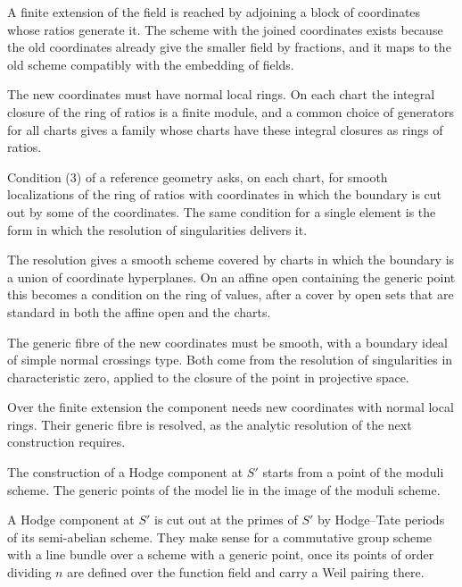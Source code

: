 A finite extension of the field is reached by adjoining a block of coordinates whose ratios generate it. The scheme
with the joined coordinates exists because the old coordinates already give the smaller field by fractions, and it maps
to the old scheme compatibly with the embedding of fields.

The new coordinates must have normal local rings. On each chart the integral closure of the ring of ratios is a finite
module, and a common choice of generators for all charts gives a family whose charts have these integral closures as
rings of ratios.

Condition (3) of a reference geometry asks, on each chart, for smooth localizations of the ring of ratios with
coordinates in which the boundary is cut out by some of the coordinates. The same condition for a single element is the
form in which the resolution of singularities delivers it.

The resolution gives a smooth scheme covered by charts in which the boundary is a union of coordinate hyperplanes. On an
affine open containing the generic point this becomes a condition on the ring of values, after a cover by open sets that
are standard in both the affine open and the charts.

The generic fibre of the new coordinates must be smooth, with a boundary ideal of simple normal crossings type. Both
come from the resolution of singularities in characteristic zero, applied to the closure of the point in projective
space.

Over the finite extension the component needs new coordinates with normal local rings. Their generic fibre is
resolved, as the analytic resolution of the next construction requires.

The construction of a Hodge component at $S'$ starts from a point of the moduli scheme. The generic points of the
model lie in the image of the moduli scheme.

A Hodge component at $S'$ is cut out at the primes of $S'$ by Hodge--Tate periods of its semi-abelian scheme. They make
sense for a commutative group scheme with a line bundle over a scheme with a generic point, once its points of order
dividing $n$ are defined over the function field and carry a Weil pairing there.

